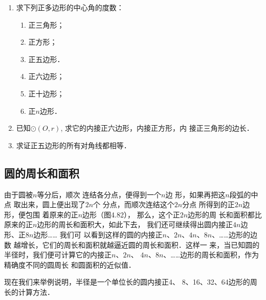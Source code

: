 \begin{ex}
\begin{enumerate}
\item  求下列正多边形的中心角的度数：
\begin{multicols}{3}
\begin{enumerate}
\item 正三角形；  \item 正方形；
\item 正五边形．
\item 正六边形；  \item 正十边形；  \item 正$n$边形．
\end{enumerate}
\end{multicols}

  \item 已知$\odot (O,r)$, 求它的内接正六边形，内接正方形，内
  接正三角形的边长．
  \item 求证正五边形的所有对角线都相等．
\end{enumerate}
\end{ex}

\subsection{圆的周长和面积}
由于圆被$n$等分后，顺次
连结各分点，便得到一个$n$边
形，如果再把这$n$段弧的中点
取出来，圆上便出现了$2n$个
分点，而顺次连结这个$2n$分点
所得到的正$2n$边形，便包围
着原来的正$n$边形（图4.82），
那么，这个正$2n$边形的周
长和面积都比原来的正$n$边形的周长和面积大，如此下去，
我们还可继续得出圆内接正$4n$边形、正$8n$边形…… 我们可
以看到这样的圆的内接正$n$、$2n$、$4n$、$8n$、……边形的边数
越增长，它们的周长和面积就越逼近圆的周长和面积．这样一
来，当已知圆的半径时，我们便可计算它的内接正$n$、$2n$、
$4n$、$8n$、……边形的周长和面积，作为精确度不同的圆周长
和圆面积的近似值．

现在我们来举例说明，半径是一个单位长的圆内接正4、
8、16、32、64边形的周长的计算方法．

\begin{figure}[htp]
  \centering
{}
  \caption{}
\end{figure}

